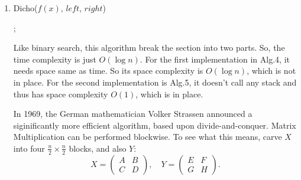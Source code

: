 \documentclass[12pt,a4paper]{article}
\makeatletter
\newtheorem*{solution}{Solution}
\theoremstyle{definition}
\renewenvironment{solution}[1][Solution] {\par\pushQED{\qed}\normalfont\topsep6\p@\@plus6\p@\relax\trivlist\item[\hskip\labelsep\bfseries#1\@addpunct{.}]\ignorespaces}{\popQED\endtrivlist\@endpefalse} \makeatother
\makeatother
\begin{document}
\begin{enumerate}
\begin{solution}
\begin{minipage}[t]{0.49\textwidth}
\begin{algorithm}[H]
    
\end{algorithm}
\end{minipage}
\begin{minipage}[t]{0.455\textwidth}
\begin{algorithm}[H]
\BlankLine
	\caption{Dicho($f(x)$, $left$, $right$)} \label{Alg-NonRecursiveBS}
		
	\BlankLine	
	;
\end{algorithm}\end{minipage}
Like binary search, this algorithm break the section into two parts. So, the time complexity is just $O(\log n)$. For the first implementation in Alg.4, it needs space same as time. So its space complexity is $O(\log n)$, which is not in place. For the second implementation is Alg.5, it doesn't call any stack and thus has space complexity $O(1)$, which is in place.
\end{solution}



In 1969, the German mathematician Volker Strassen announced a siginificantly more efficient algorithm, based upon divide-and-conquer. Matrix Multiplication can be performed blockwise. To see what this means, carve $X$ into four $\frac{n}{2} \times \frac{n}{2}$ blocks, and also $Y$:
\begin{displaymath}
X=
\left(\begin{array}{c|c}
A & B \\
\hline
C & D \end{array}\right), \quad
Y=\left(\begin{array}{c|c}
E & F \\
\hline
G & H \end{array}\right).
 \end{displaymath}


\end{enumerate}
\end{document}
